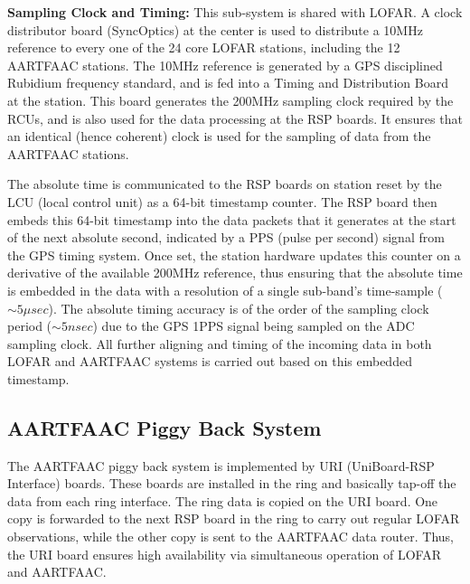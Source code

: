 \documentclass{ws-jai}
\begin{document}
\noindent \textbf  {Sampling Clock and  Timing:} This sub-system is  shared with
LOFAR.  A  clock  distributor  board  (SyncOptics) at  the  center  is  used  to
distribute  a 10MHz  reference  to every  one  of the  24  core LOFAR  stations,
including the 12  AARTFAAC stations.  The 10MHz reference is  generated by a GPS
disciplined  Rubidium  frequency  standard,  and   is  fed  into  a  Timing  and
Distribution Board  at the  station.  This board  generates the  200MHz sampling
clock required by the RCUs, and is also  used for the data processing at the RSP
boards. It  ensures that  an identical  (hence coherent) clock  is used  for the
sampling of data from the AARTFAAC stations.

The absolute time is communicated to the  RSP boards on station reset by the LCU
(local control  unit) as a 64-bit  timestamp counter. The RSP  board then embeds
this 64-bit timestamp  into the data packets  that it generates at  the start of
the next absolute second, indicated by a  PPS (pulse per second) signal from the
GPS timing  system.  Once set,  the station hardware  updates this counter  on a
derivative of  the available 200MHz  reference, thus ensuring that  the absolute
time  is  embedded  in  the  data  with a  resolution  of  a  single  sub-band's
time-sample ($\sim5\mu  sec$). The absolute timing  accuracy is of the  order of
the sampling clock period ($\sim5nsec$) due to the GPS 1PPS signal being sampled
on the ADC sampling clock.  All further aligning and timing of the incoming data
in  both LOFAR  and  AARTFAAC systems  is  carried out  based  on this  embedded
timestamp.

\subsection {AARTFAAC Piggy Back System}
The AARTFAAC  piggy back system  is implemented by URI  (UniBoard-RSP Interface)
boards. These  boards are installed in  the ring and basically  tap-off the data
from each ring interface. The ring data is  copied on the URI board. One copy is
forwarded  to  the next  RSP  board  in the  ring  to  carry out  regular  LOFAR
observations, while  the other copy is  sent to the AARTFAAC  data router. Thus,
the URI board ensures high availability  via simultaneous operation of LOFAR and
AARTFAAC.
\end{document}
